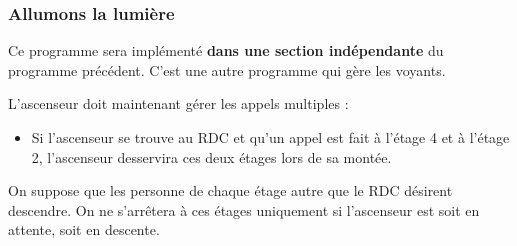 \documentclass[11pt, multicol]{article}
\begin{document}

\subsubsection{Allumons la lumière}

\begin{UPSTIactivite}
	Ce programme sera implémenté \textbf{dans une section indépendante} du programme précédent. C'est une autre programme qui gère les voyants.
\end{UPSTIactivite}


\begin{UPSTIactivite}
	L'ascenseur doit maintenant gérer les appels multiples :
	\begin{itemize}
		\item Si l'ascenseur se trouve au RDC et qu'un appel est fait à l'étage 4 et à l'étage 2, l'ascenseur desservira ces deux étages lors de sa montée.
	\end{itemize}
\end{UPSTIactivite}

\begin{UPSTIactivite}
	On suppose que les personne de chaque étage autre que le RDC désirent descendre. On ne s'arrêtera à ces étages uniquement si l'ascenseur est soit en attente, soit en descente.
\end{UPSTIactivite}
\end{document}
